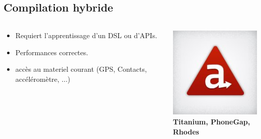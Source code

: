 \documentclass{beamer}
\begin{document}
\subsection{Compilation hybride}
\begin{frame}
\begin{columns}[c]
  \begin{column}{0.5\textwidth}
    \begin{itemize}
      \item Requiert l'apprentissage d'un DSL ou d'APIs.
	\item Performances correctes.
	\item accès au materiel courant (GPS, Contacts, accéléromètre, ...)
    \end{itemize}
  \end{column}
  \begin{column}{0.5\textwidth}
    \begin{center}
      \includegraphics[scale=0.4]{titanium} \\
	\textbf{Titanium, PhoneGap, Rhodes}
    \end{center}
  \end{column}
\end{columns}
\end{frame}
\end{document}
